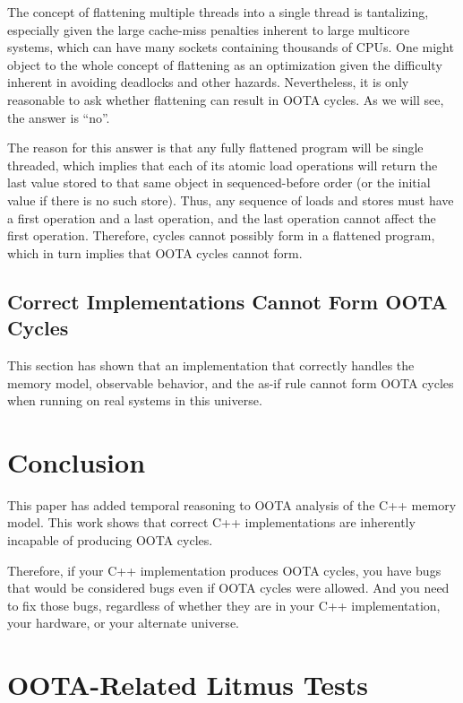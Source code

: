\documentclass[10]{article}
\begin{document}
The concept of flattening multiple threads into a single thread is
tantalizing, especially given the large cache-miss penalties inherent
to large multicore systems, which can have many sockets containing
thousands of CPUs.
One might object to the whole concept of flattening as an
optimization given the difficulty inherent in avoiding deadlocks
and other hazards.
Nevertheless, it is only reasonable to ask whether flattening can
result in OOTA cycles.
As we will see, the answer is ``no''.

The reason for this answer is that any fully flattened program will be
single threaded, which implies that each of its atomic load operations
will return the last value stored to that same object in sequenced-before
order (or the initial value if there is no such store).
Thus, any sequence of loads and stores must have a first operation and
a last operation, and the last operation cannot affect the first
operation.
Therefore, cycles cannot possibly form in a flattened program,
which in turn implies that OOTA cycles cannot form.

\subsection{Correct Implementations Cannot Form OOTA Cycles}
\label{sec:Correct Implementations Cannot Form OOTA Cycles}

This section has shown that an implementation that correctly
handles the memory model, observable behavior, and the as-if rule
cannot form OOTA cycles when running on real systems in this
universe.

\section{Conclusion}
\label{sec:Conclusion}

This paper has added temporal reasoning to OOTA analysis of the C++
memory model.
This work shows that correct C++ implementations are inherently incapable
of producing OOTA cycles.

Therefore, if your C++ implementation produces OOTA cycles, you have
bugs that would be considered bugs even if OOTA cycles were allowed.
And you need to fix those bugs, regardless of whether they are in your
C++ implementation, your hardware, or your alternate universe.


\appendix

\section{OOTA-Related Litmus Tests}
\label{app:OOTA-Related Litmus Tests}
\end{document}
